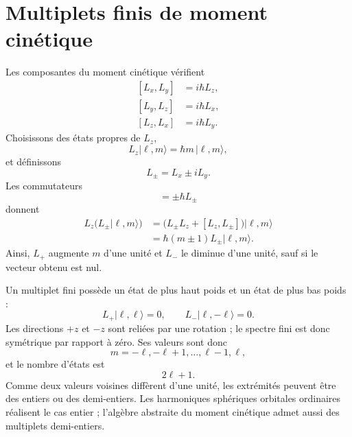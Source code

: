\section{Multiplets finis de moment cinétique}

Les composantes du moment cinétique vérifient
\begin{equation}
\begin{aligned}
[L_x,L_y]&=i\hbar L_z,\\
[L_y,L_z]&=i\hbar L_x,\\
[L_z,L_x]&=i\hbar L_y.
\end{aligned}
\end{equation}
Choisissons des états propres de \(L_z\),
\begin{equation}
L_z|\ell,m\rangle=\hbar m\,|\ell,m\rangle,
\end{equation}
et définissons
\begin{equation}
L_\pm=L_x\pm iL_y.
\end{equation}
Les commutateurs
\begin{equation}
[L_z,L_\pm]=\pm\hbar L_\pm
\end{equation}
donnent
\begin{align}
L_z\bigl(L_\pm|\ell,m\rangle\bigr)
&=\bigl(L_\pm L_z+[L_z,L_\pm]\bigr)|\ell,m\rangle \\
&=\hbar(m\pm1)L_\pm|\ell,m\rangle.
\end{align}
Ainsi, \(L_+\) augmente \(m\) d’une unité et \(L_-\) le diminue d’une unité, sauf si le vecteur obtenu est nul.

Un multiplet fini possède un état de plus haut poids et un état de plus bas poids :
\begin{equation}
L_+|\ell,\ell\rangle=0,
\qquad
L_-|\ell,-\ell\rangle=0.
\end{equation}
Les directions \(+z\) et \(-z\) sont reliées par une rotation ; le spectre fini est donc symétrique par rapport à zéro. Ses valeurs sont donc
\begin{equation}
m=-\ell,-\ell+1,\ldots,\ell-1,\ell,
\end{equation}
et le nombre d’états est
\begin{equation}
2\ell+1.
\end{equation}
Comme deux valeurs voisines diffèrent d’une unité, les extrémités peuvent être des entiers ou des demi-entiers. Les harmoniques sphériques orbitales ordinaires réalisent le cas entier ; l’algèbre abstraite du moment cinétique admet aussi des multiplets demi-entiers.

\begin{classroomqa}\end{classroomqa}

